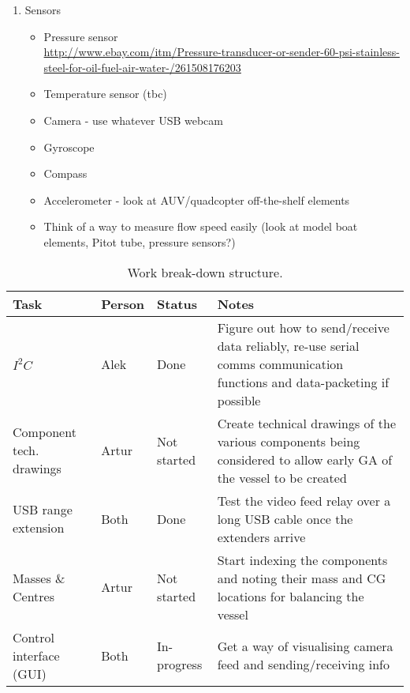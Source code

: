 \documentclass[11pt,a4paper,oneside]{report}
\begin{document}
\begin{enumerate}
\item Sensors
	\begin{itemize}
	\item Pressure sensor \\
		\url{http://www.ebay.com/itm/Pressure-transducer-or-sender-60-psi-stainless-steel-for-oil-fuel-air-water-/261508176203}
	\item Temperature sensor (tbc)
	\item Camera - use whatever USB webcam
	\item Gyroscope
	\item Compass
	\item Accelerometer - look at AUV/quadcopter off-the-shelf elements
	\item Think of a way to measure flow speed easily (look at model boat elements,
		Pitot tube, pressure sensors?)
	\end{itemize}
\end{enumerate}

\begin{table}[h]
\caption{Work break-down structure.}
\begin{tabularx}{\textwidth}{@{}lllX@{}}
\toprule
\textbf{Task} 	& \textbf{Person} 	& \textbf{Status} & \textbf{Notes} \\ \midrule
%
$I^2C$        				& Alek  & Done			& Figure out how to send/receive data reliably, re-use serial comms 
													communication functions and data-packeting if possible \\
Component tech. drawings 	& Artur	& Not started	& Create technical drawings of the various
													components being considered to allow early GA of the vessel to be created  \\
USB range extension 		& Both  & Done			& Test the video feed relay over a long USB cable once
													the extenders arrive \\
Masses \& Centres			& Artur	& Not started	& Start indexing the components and noting their
													mass and CG locations for balancing the vessel  \\
Control interface (GUI)		& Both	& In-progress	& Get a way of visualising camera feed and sending/receiving info \\
%
\bottomrule
\end{tabularx}
\end{table}
\end{document}
